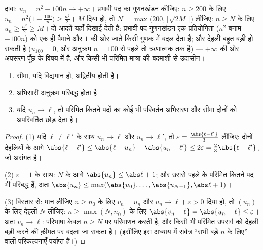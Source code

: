 \begin{example}[अनंत की ओर अपसरण, प्रमाणित]\label{ex:b1:seq:toinfinity}
दावा: $u_n = n^2 - 100n \to +\infty$। प्रभावी पद का गुणनखंडन कीजिए: $n \geq
200$ के लिए $u_n = n^2\bigl(1 - \frac{100}{n}\bigr) \geq \frac{n^2}{2}$। $M$
दिया हो, तो $N = \max\bigl(200, \lceil\sqrt{2M}\rceil\bigr)$ लीजिए: $n \geq
N$ के लिए $u_n \geq \frac{n^2}{2} \geq M$। दो आदतें यहाँ दिखाई देती हैं:
प्रभावी-पद गुणनखंडन एक प्रतियोगिता ($n^2$ बनाम $-100n$) को एक ही पैमाने और
$1$ की ओर जाते किसी गुणक में बदल देता है; और देहली बहुत बड़ी हो सकती है
($u_{100} = 0$, और अनुक्रम $n = 100$ से पहले तो ऋणात्मक तक है) --- $+\infty$
की ओर अपसरण पूँछ के विषय में  है, और किसी भी परिमित मात्रा की बदमाशी से
उदासीन।
\end{example}

\begin{proposition}\label{prop:b1:seq:first}
\begin{enumerate}
  \item सीमा, यदि विद्यमान हो, अद्वितीय होती है।
  \item अभिसारी अनुक्रम परिबद्ध होता है।
  \item यदि $u_n \to \ell$, तो परिमित कितने पदों का कोई भी परिवर्तन अभिसरण
  और सीमा दोनों को अपरिवर्तित छोड़ देता है।
\end{enumerate}
\end{proposition}

\begin{proof}
(1) यदि $\ell \neq \ell'$ के साथ $u_n \to \ell$ और $u_n \to \ell'$, तो
$\varepsilon = \frac{\abs{\ell - \ell'}}{3}$ लीजिए: दोनों देहलियों के आगे
$\abs{\ell - \ell'} \leq \abs{\ell - u_n} + \abs{u_n - \ell'} \leq
2\varepsilon = \frac23 \abs{\ell - \ell'}$, जो असंगत है।

(2) $\varepsilon = 1$ के साथ: $N$ के आगे $\abs{u_n} \leq \abs\ell + 1$; और
उससे पहले के परिमित कितने पद भी परिबद्ध हैं, अतः $\abs{u_n} \leq
\max(\abs{u_0}, \dots, \abs{u_{N-1}}, \abs\ell + 1)$।

(3) विस्तार से: मान लीजिए $n \geq n_0$ के लिए $v_n = u_n$ और $u_n \to \ell$।
$\varepsilon > 0$ दिया हो, तो $(u_n)$ के लिए देहली $N$ लीजिए: $n \geq
\max(N, n_0)$ के लिए $\abs{v_n - \ell} = \abs{u_n - \ell} \leq \varepsilon$।
अतः $v_n \to \ell$: परिभाषा केवल $n \geq N$ पर परिमाणन करती है, और किसी भी
परिमित उपसर्ग को देहली बड़ी करने की क़ीमत पर बदला जा सकता है। (इसीलिए इस
अध्याय में सर्वत्र ``सभी बड़े $n$ के लिए'' वाली परिकल्पनाएँ पर्याप्त हैं।)
\end{proof}

